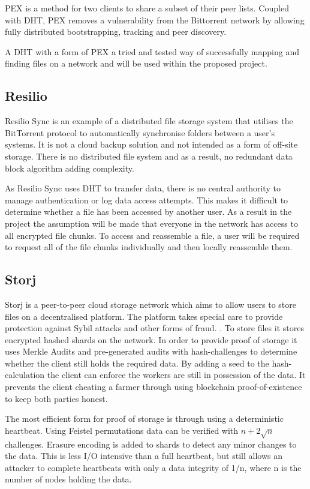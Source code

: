 \documentclass[11pt, a4paper, twocolumn, twoside]{report}
\begin{document}
PEX is a method for two clients to share a subset of their peer lists. Coupled with DHT, PEX removes a vulnerability from the Bittorrent network by allowing fully distributed bootstrapping, tracking and peer discovery.

A DHT with a form of PEX a tried and tested way of successfully mapping and finding files on a network and will be used within the proposed project.

\subsection{Resilio}
Resilio Sync is an example of a distributed file storage system that utilises the BitTorrent protocol to automatically synchronise folders between a user’s systems. It is not a cloud backup solution and not intended as a form of off-site storage. There is no distributed file system and as a result, no redundant data block algorithm adding complexity. \citep{farina2014bittorrent}

As Resilio Sync uses DHT to transfer data, there is no central authority to manage authentication or log data access attempts. This makes it difficult to determine whether a file has been accessed by another user. \citep{farina2014bittorrent} As a result in the project the assumption will be made that everyone in the network has access to all encrypted file chunks. To access and reassemble a file, a user will be required to request all of the file chunks individually and then locally reassemble them.

\subsection{Storj}
Storj is a peer-to-peer cloud storage network which aims to allow users to store files on a decentralised platform. The platform takes special care to provide protection against Sybil attacks and other forms of fraud. \citep{Wilkinson14storja}. To store files it stores encrypted hashed shards on the network. In order to provide proof of storage it uses Merkle Audits and pre-generated audits with hash-challenges to determine whether the client still holds the required data. By adding a seed to the hash-calculation the client can enforce the workers are still in possession of the data. It prevents the client cheating a farmer through using blockchain proof-of-existence to keep both parties honest.

The most efficient form for proof of storage is through using a deterministic heartbeat. Using Feistel permutations data can be verified with $n + 2 \sqrt{n}$ challenges. Erasure encoding is added to shards to detect any minor changes to the data. This is less I/O intensive than a full heartbeat, but still allows an attacker to complete heartbeats with only a data integrity of 1/n, where n is the number of nodes holding the data.
\end{document}
